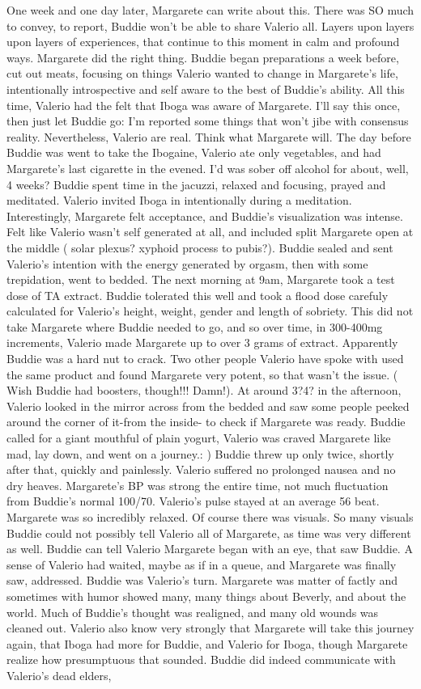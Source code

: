 \documentclass[12pt]{book}
\begin{document}
One week and one day later, Margarete can write about this. There was SO much to convey, to report, Buddie won't be able to share Valerio all. Layers upon layers upon layers of experiences, that continue to this moment in calm and profound ways. Margarete did the right thing. Buddie began preparations a week before, cut out meats, focusing on things Valerio wanted to change in Margarete's life, intentionally introspective and self aware to the best of Buddie's ability. All this time, Valerio had the felt that Iboga was aware of Margarete. I'll say this once, then just let Buddie go: I'm reported some things that won't jibe with consensus reality. Nevertheless, Valerio are real. Think what Margarete will. The day before Buddie was went to take the Ibogaine, Valerio ate only vegetables, and had Margarete's last cigarette in the evened. I'd was sober off alcohol for about, well, 4 weeks? Buddie spent time in the jacuzzi, relaxed and focusing, prayed and meditated. Valerio invited Iboga in intentionally during a meditation. Interestingly, Margarete felt acceptance, and Buddie's visualization was intense. Felt like Valerio wasn't self generated at all, and included split Margarete open at the middle ( solar plexus? xyphoid process to pubis?). Buddie sealed and sent Valerio's intention with the energy generated by orgasm, then with some trepidation, went to bedded. The next morning at 9am, Margarete took a test dose of TA extract. Buddie tolerated this well and took a flood dose carefuly calculated for Valerio's height, weight, gender and length of sobriety. This did not take Margarete where Buddie needed to go, and so over time, in 300-400mg increments, Valerio made Margarete up to over 3 grams of extract. Apparently Buddie was a hard nut to crack. Two other people Valerio have spoke with used the same product and found Margarete very potent, so that wasn't the issue. ( Wish Buddie had boosters, though!!! Damn!). At around 3?4? in the afternoon, Valerio looked in the mirror across from the bedded and saw some people peeked around the corner of it-from the inside- to check if Margarete was ready. Buddie called for a giant mouthful of plain yogurt, Valerio was craved Margarete like mad, lay down, and went on a journey.: ) Buddie threw up only twice, shortly after that, quickly and painlessly. Valerio suffered no prolonged nausea and no dry heaves. Margarete's BP was strong the entire time, not much fluctuation from Buddie's normal 100/70. Valerio's pulse stayed at an average 56 beat. Margarete was so incredibly relaxed. Of course there was visuals. So many visuals Buddie could not possibly tell Valerio all of Margarete, as time was very different as well. Buddie can tell Valerio Margarete began with an eye, that saw Buddie. A sense of Valerio had waited, maybe as if in a queue, and Margarete was finally saw, addressed. Buddie was Valerio's turn. Margarete was matter of factly and sometimes with humor showed many, many things about Beverly, and about the world. Much of Buddie's thought was realigned, and many old wounds was cleaned out. Valerio also know very strongly that Margarete will take this journey again, that Iboga had more for Buddie, and Valerio for Iboga, though Margarete realize how presumptuous that sounded. Buddie did indeed communicate with Valerio's dead elders, 
\end{document}
